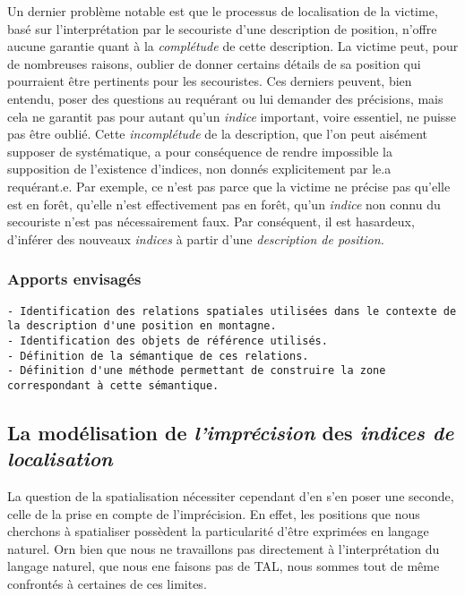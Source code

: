 Un dernier problème notable est que le processus de localisation de la
victime, basé sur l'interprétation par le secouriste d'une description
de position, n'offre aucune garantie quant à la \emph{complétude} de
cette description. La victime peut, pour de nombreuses raisons,
oublier de donner certains détails de sa position qui pourraient être
pertinents pour les secouristes. Ces derniers peuvent, bien entendu,
poser des questions au requérant ou lui demander des précisions, mais
cela ne garantit pas pour autant qu'un \emph{indice} important, voire
essentiel, ne puisse pas être oublié. Cette \emph{incomplétude} de la
description, que l'on peut aisément supposer de systématique, a pour
conséquence de rendre impossible la supposition de l’existence
d'indices, non donnés explicitement par le.a requérant.e. Par exemple,
ce n'est pas parce que la victime ne précise pas qu'elle est en forêt,
qu'elle n'est effectivement pas en forêt, \ie qu'un \emph{indice} non
connu du secouriste n'est pas nécessairement faux. Par conséquent, il
est hasardeux, d'inférer des nouveaux \emph{indices} à partir d'une
\emph{description de position.}

\subsubsection{Apports envisagés}

\begin{verbatim}
- Identification des relations spatiales utilisées dans le contexte de
la description d'une position en montagne.
- Identification des objets de référence utilisés.
- Définition de la sémantique de ces relations.
- Définition d'une méthode permettant de construire la zone
correspondant à cette sémantique.
\end{verbatim}

\subsection{La modélisation de \emph{l'imprécision} des \emph{indices
    de localisation}}
\label{subsec:2-1-2}

La question de la spatialisation nécessiter cependant d'en s'en poser
une seconde, celle de la prise en compte de l'imprécision. En effet,
les positions que nous cherchons à spatialiser possèdent la
particularité d'être exprimées en langage naturel. Orn bien que nous
ne travaillons pas directement à l'interprétation du langage naturel,
\ie que nous ene faisons pas de TAL, nous sommes tout de même
confrontés à certaines de ces limites.


